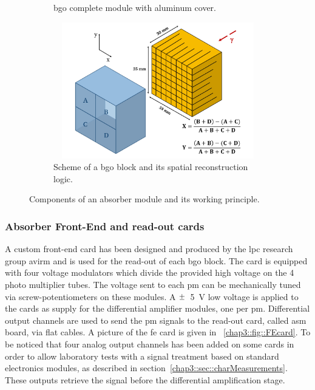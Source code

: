 \begin{figure}
\begin{subfigure}[t]{.5\textwidth}
\caption{\gls{bgo} complete module with aluminum cover.}
\label{chap3::fig::originalBlock_withAl}
\end{subfigure}
\begin{subfigure}[t]{.5\textwidth}
\centering
\includegraphics[width=1\textwidth, height=16em]{03_GraphicFiles/chapter3_CLaRySproto/Absorber/block_scheme.pdf}
\caption{Scheme of a \gls{bgo} block and its spatial reconstruction logic.}
\label{chap3::fig::BGOblockScheme} 
\end{subfigure}
\caption{Components of an absorber module and its working principle.}
\label{chap5::fig::BGO_block}
\end{figure}


\subsubsection{Absorber Front-End and read-out cards}\label{chap3::subsubsec::AbsorberFEcard}

A custom front-end card has been designed and produced by the \gls{lpc} research group \gls{avirm} and is used for the read-out of each \gls{bgo} block. The card is equipped with four voltage modulators which divide the provided high voltage on the 4 photo multiplier tubes. The voltage sent to each \gls{pm} can be mechanically tuned via screw-potentiometers on these modules. A $\varpm$~5~V low voltage is applied to the cards as supply for the differential amplifier modules, one per \gls{pm}. Differential output channels are used to send the \gls{pm} signals to the read-out card, called \gls{asm} board, via flat cables. A picture of the \gls{fe} card is given in \figurename~\ref{chap3::fig::FEcard}. To be noticed that four analog output channels has been added on some cards in order to allow laboratory tests with a signal treatment based on standard electronics modules, as described in section~\ref{chap3::sec::charMeasurements}. These outputs retrieve the signal before the differential amplification stage.\\ 

